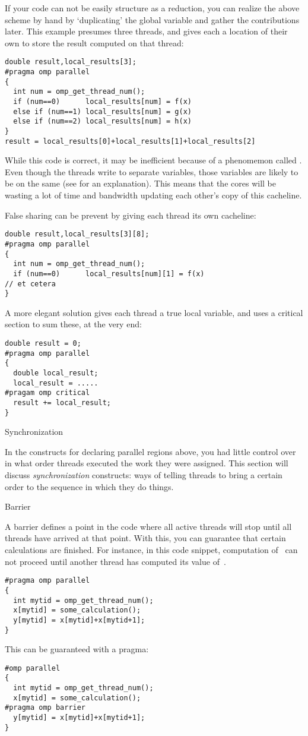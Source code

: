If your code can not be easily structure as a reduction, you can 
realize the above scheme by hand by
`duplicating' the global variable and gather the contributions later.
This example presumes three threads, and gives each a location of their
own to store the result computed on that thread:
\begin{verbatim}
double result,local_results[3];
#pragma omp parallel
{
  int num = omp_get_thread_num();
  if (num==0)      local_results[num] = f(x)
  else if (num==1) local_results[num] = g(x)
  else if (num==2) local_results[num] = h(x)
}
result = local_results[0]+local_results[1]+local_results[2]
\end{verbatim}
While this code is correct, it may be inefficient because of a
phenomemon called . Even though the threads write
to separate variables, those variables are likely to be on the same 
 (see  for an explanation).
This means that the cores will be wasting a lot of time and bandwidth updating
each other's copy of this cacheline.

False sharing can be prevent by giving each thread its own cacheline:
\begin{verbatim}
double result,local_results[3][8];
#pragma omp parallel
{
  int num = omp_get_thread_num();
  if (num==0)      local_results[num][1] = f(x)
// et cetera
}
\end{verbatim}
A more elegant solution gives each thread a true local variable,
and uses a critical section to sum these, at the very end:
\begin{verbatim}
double result = 0;
#pragma omp parallel
{
  double local_result;
  local_result = .....
#pragam omp critical
  result += local_result;
}
\end{verbatim}

 {Synchronization}

In the constructs for declaring parallel regions above, you had little control over 
in what order threads executed the work they were assigned.
This section will discuss \emph{synchronization} constructs: ways of telling
threads to bring a certain order to the sequence in which they do things.

 {Barrier}

A barrier defines a point in the code where all active threads will stop
until all threads have arrived at that point. With this, you can guarantee that
certain calculations are finished. For instance, in this code snippet, computation 
of~ can not proceed until another thread has computed its value of~.
\begin{verbatim}
#pragma omp parallel 
{
  int mytid = omp_get_thread_num();
  x[mytid] = some_calculation();
  y[mytid] = x[mytid]+x[mytid+1];
}
\end{verbatim}
This can be guaranteed with a  pragma:
\begin{verbatim}
#omp parallel 
{
  int mytid = omp_get_thread_num();
  x[mytid] = some_calculation();
#pragma omp barrier
  y[mytid] = x[mytid]+x[mytid+1];
}
\end{verbatim}

